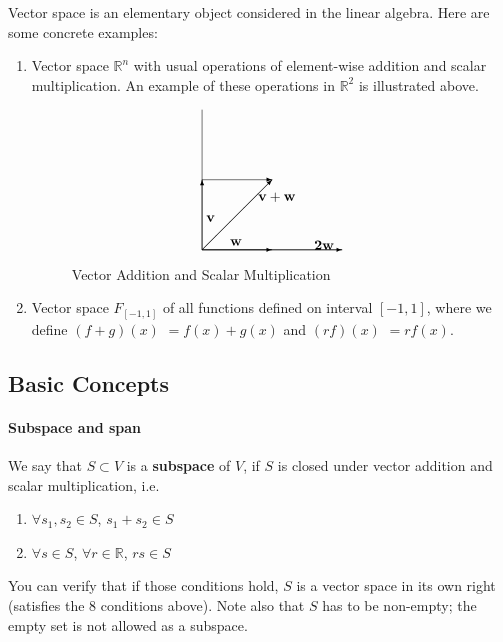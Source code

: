 \documentclass[12pt,oneside]{article}
\begin{document}
Vector space is an elementary object considered in the linear algebra. Here are some concrete examples:
\begin{enumerate}
\item Vector space ${\mathbb{R}}^{n}$ with usual operations of
  element-wise addition and scalar multiplication. An example of these
  operations in $\mathbb{R}^2$ is illustrated above.
\begin{figure}

\[
\setlength{\unitlength}{10pt}
\begin{picture}(10,10)
\put(0,0){\line(1,0){10}}
\put(0,0){\line(0,1){10}}
\put(0,0){\vector(0,1){5}}
\put(0,0){\vector(1,0){5}}
\put(0.3,2){$\bf v$}
\put(2,0.3){${\bf w}$}
\put(0,5){\vector(1,0){5}}
\put(0,0){\vector(1,1){5}}
\put(4,3.5){$\bf v + w$}
\put(0,0){\vector(1,0){10}}
\put(8, 0){$\bf 2w$}
\end{picture}
\]
\caption{Vector Addition and Scalar Multiplication}\label{span1}
\end{figure}

\item Vector space $F_{[-1,1]}$ of all functions defined on interval
  $[-1, 1]$, where we define $(f + g) (x)$ $= f(x) + g(x)$ and $(r f)
  (x)$ $= r f(x)$.
\end{enumerate}


\subsection{Basic Concepts}
\paragraph{Subspace and span} 
We say that $S \subset V$ is a \textbf{subspace} of $V$, if $S$ is
closed under vector addition and scalar multiplication, i.e.
\begin{enumerate}
\item $\forall s_{1}, s_{2} \in S$, $s_{1} + s_{2} \in S$
\item $\forall s \in S$, $\forall r \in \mathbb{R}$, $r s \in S$
\end{enumerate}
You can verify that if those conditions hold, $S$ is a vector space in
its own right (satisfies the 8 conditions above). Note also that $S$
has to be non-empty; the empty set is not allowed as a subspace.\\
\end{document}
